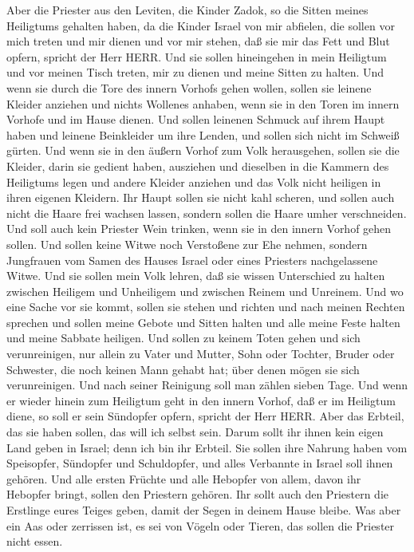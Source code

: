  Aber die Priester aus den Leviten, die Kinder Zadok, so
die Sitten meines Heiligtums gehalten haben, da die Kinder Israel von
mir abfielen, die sollen vor mich treten und mir dienen und vor mir
stehen, daß sie mir das Fett und Blut opfern, spricht der Herr HERR.
 Und sie sollen hineingehen in mein Heiligtum und vor
meinen Tisch treten, mir zu dienen und meine Sitten zu halten.
 Und wenn sie durch die Tore des innern Vorhofs gehen
wollen, sollen sie leinene Kleider anziehen und nichts Wollenes anhaben,
wenn sie in den Toren im innern Vorhofe und im Hause dienen.
 Und sollen leinenen Schmuck auf ihrem Haupt haben und
leinene Beinkleider um ihre Lenden, und sollen sich nicht im Schweiß
gürten.  Und wenn sie in den äußern Vorhof zum Volk
herausgehen, sollen sie die Kleider, darin sie gedient haben, ausziehen
und dieselben in die Kammern des Heiligtums legen und andere Kleider
anziehen und das Volk nicht heiligen in ihren eigenen Kleidern.
 Ihr Haupt sollen sie nicht kahl scheren, und sollen auch
nicht die Haare frei wachsen lassen, sondern sollen die Haare umher
verschneiden.  Und soll auch kein Priester Wein trinken,
wenn sie in den innern Vorhof gehen sollen.  Und sollen
keine Witwe noch Verstoßene zur Ehe nehmen, sondern Jungfrauen vom Samen
des Hauses Israel oder eines Priesters nachgelassene Witwe.
 Und sie sollen mein Volk lehren, daß sie wissen
Unterschied zu halten zwischen Heiligem und Unheiligem und zwischen
Reinem und Unreinem.  Und wo eine Sache vor sie kommt,
sollen sie stehen und richten und nach meinen Rechten sprechen und
sollen meine Gebote und Sitten halten und alle meine Feste halten und
meine Sabbate heiligen.  Und sollen zu keinem Toten gehen
und sich verunreinigen, nur allein zu Vater und Mutter, Sohn oder
Tochter, Bruder oder Schwester, die noch keinen Mann gehabt hat; über
denen mögen sie sich verunreinigen.  Und nach seiner
Reinigung soll man zählen sieben Tage.  Und wenn er wieder
hinein zum Heiligtum geht in den innern Vorhof, daß er im Heiligtum
diene, so soll er sein Sündopfer opfern, spricht der Herr HERR.
 Aber das Erbteil, das sie haben sollen, das will ich
selbst sein. Darum sollt ihr ihnen kein eigen Land geben in Israel; denn
ich bin ihr Erbteil.  Sie sollen ihre Nahrung haben vom
Speisopfer, Sündopfer und Schuldopfer, und alles Verbannte in Israel
soll ihnen gehören.  Und alle ersten Früchte und alle
Hebopfer von allem, davon ihr Hebopfer bringt, sollen den Priestern
gehören. Ihr sollt auch den Priestern die Erstlinge eures Teiges geben,
damit der Segen in deinem Hause bleibe.  Was aber ein Aas
oder zerrissen ist, es sei von Vögeln oder Tieren, das sollen die
Priester nicht essen.

